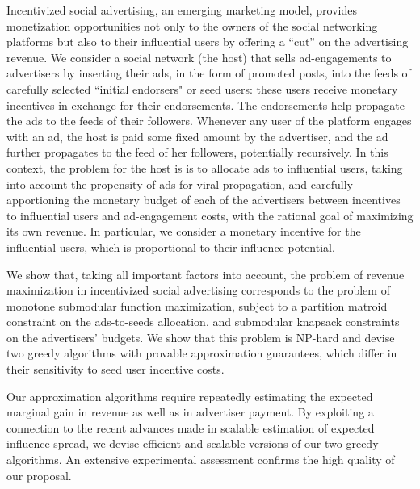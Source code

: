 \enlargethispage{4\baselineskip}
Incentivized social advertising, an emerging marketing model, provides monetization opportunities not only to the owners of the social networking  platforms but also to their influential users by offering a ``cut'' on the advertising revenue. We consider a social network (the host) that sells ad-engagements to advertisers by inserting their ads, in the form of promoted posts, into the feeds of carefully selected ``initial endorsers" or seed users: these users receive monetary incentives in exchange for their endorsements. The endorsements help propagate the ads to the feeds of their followers. Whenever any user of the platform engages with an ad, the host is paid some fixed amount by the advertiser, and the ad further propagates to the feed of her followers, potentially recursively. In this context, the problem for the host is is to allocate ads to influential users, taking into account the propensity of ads for viral propagation, and carefully apportioning the monetary budget of each of the advertisers between incentives to influential users and ad-engagement costs, with the rational goal of maximizing its own revenue.
In particular, we consider a monetary incentive for the influential users, which is proportional to their influence potential.

We show that, taking all important factors into account, the problem of revenue maximization in incentivized social advertising corresponds to the problem of monotone submodular function maximization, subject to a partition matroid constraint on the ads-to-seeds allocation, and submodular knapsack constraints on the advertisers' budgets. We show that this problem is NP-hard and devise two greedy algorithms with provable approximation guarantees, which differ in their sensitivity to seed user incentive costs.

Our approximation algorithms require repeatedly estimating the expected marginal gain in revenue as well as in advertiser payment. By exploiting a connection to the recent advances made in scalable estimation of expected influence spread, we devise efficient and scalable versions of our two greedy algorithms. An extensive experimental assessment confirms the high quality of our proposal.







